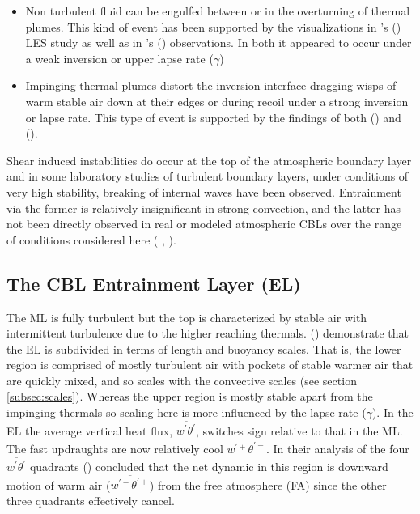 \begin{itemize}

\item{Non turbulent fluid can be engulfed between or in the overturning of thermal plumes. This kind of event has been supported by the visualizations in \citeauthor{SullMoengStev}'s (\citeyear{SullMoengStev}) \acs{LES} study as well as in \citeauthor{Traum11}'s (\citeyear{Traum11}) observations. In both it appeared to occur under a weak inversion or upper lapse rate ($\gamma$)}

\item{
Impinging thermal plumes distort the inversion interface dragging wisps of warm stable air down at their edges or during recoil under a strong inversion or lapse rate. This type of event is supported by the findings  of both \citeauthor{SullMoengStev} (\citeyear{SullMoengStev}) and \citeauthor{Traum11} (\citeyear{Traum11}).}

\end{itemize}

Shear induced instabilities do occur at the top of the atmospheric boundary layer and in some laboratory studies of turbulent boundary layers, under conditions of very high stability, breaking of internal waves have been observed.  Entrainment via the former is relatively insignificant in strong convection, and the latter has not been directly observed in real or modeled atmospheric \acs{CBL}s over the range of conditions considered here (\citeauthor{Traum11} \citeyear{Traum11}, \citeauthor{SullMoengStev} \citeyear{SullMoengStev}).

\subsection{The CBL Entrainment Layer (EL)}
\label{subsec:cblel}

The \acs{ML} is fully turbulent but the top is characterized by stable air with intermittent turbulence due to the higher reaching thermals. \citeauthor{GarciaMellado} (\citeyear{GarciaMellado}) demonstrate that the \acs{EL} is subdivided in terms of length and buoyancy scales.  That is, the lower region is comprised of mostly turbulent air with pockets of stable warmer air that are quickly mixed, and so scales with the convective scales (see section \ref{subsec:scales}). Whereas the upper region is mostly stable apart from the impinging thermals so scaling here is more influenced by the lapse rate ($\gamma$).  In the \acs{EL} the average vertical heat flux, $\overline{w^{'}\theta^{'}}$, switches sign relative to that in the \acs{ML}.  The fast updraughts are now relatively cool $\overline{w^{'+}\theta^{'-}}$.  In their analysis of the four $\overline{w^{'}\theta^{'}}$ quadrants \citeauthor{SullMoengStev} (\citeyear{SullMoengStev}) concluded that the net dynamic in this region is downward motion of warm air ($\overline{w^{'-}\theta^{'+}}$) from the free atmosphere (\acs{FA}) since the other three quadrants effectively cancel.\\

